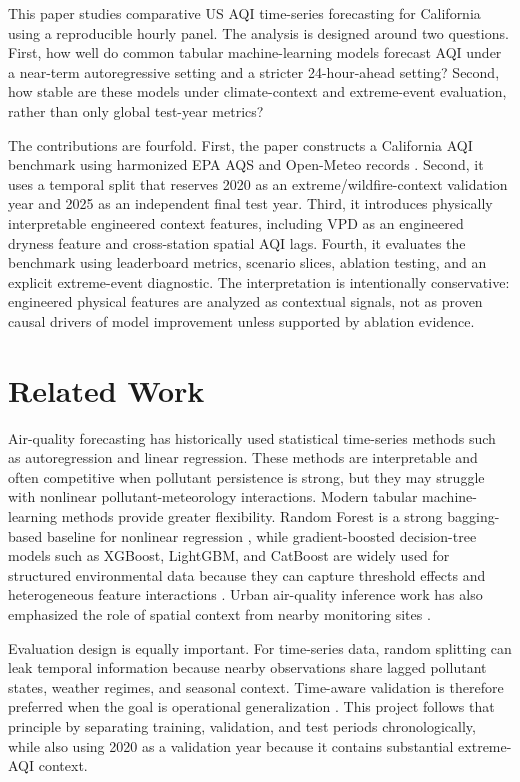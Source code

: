 \documentclass[11pt,a4paper]{article}
\begin{document}
This paper studies comparative US AQI time-series forecasting for California using a reproducible hourly panel. The analysis is designed around two questions. First, how well do common tabular machine-learning models forecast AQI under a near-term autoregressive setting and a stricter 24-hour-ahead setting? Second, how stable are these models under climate-context and extreme-event evaluation, rather than only global test-year metrics?

The contributions are fourfold. First, the paper constructs a California AQI benchmark using harmonized EPA AQS and Open-Meteo records \cite{epa_aqs,epa_aqs_api}. Second, it uses a temporal split that reserves 2020 as an extreme/wildfire-context validation year and 2025 as an independent final test year. Third, it introduces physically interpretable engineered context features, including VPD as an engineered dryness feature and cross-station spatial AQI lags. Fourth, it evaluates the benchmark using leaderboard metrics, scenario slices, ablation testing, and an explicit extreme-event diagnostic. The interpretation is intentionally conservative: engineered physical features are analyzed as contextual signals, not as proven causal drivers of model improvement unless supported by ablation evidence.

\section{Related Work}
Air-quality forecasting has historically used statistical time-series methods such as autoregression and linear regression. These methods are interpretable and often competitive when pollutant persistence is strong, but they may struggle with nonlinear pollutant-meteorology interactions. Modern tabular machine-learning methods provide greater flexibility. Random Forest is a strong bagging-based baseline for nonlinear regression \cite{breiman2001random}, while gradient-boosted decision-tree models such as XGBoost, LightGBM, and CatBoost are widely used for structured environmental data because they can capture threshold effects and heterogeneous feature interactions \cite{chen2016xgboost,ke2017lightgbm,prokhorenkova2018catboost}. Urban air-quality inference work has also emphasized the role of spatial context from nearby monitoring sites \cite{zheng2013uair}.

Evaluation design is equally important. For time-series data, random splitting can leak temporal information because nearby observations share lagged pollutant states, weather regimes, and seasonal context. Time-aware validation is therefore preferred when the goal is operational generalization \cite{bergmeir2018note,roberts2017crossvalidation}. This project follows that principle by separating training, validation, and test periods chronologically, while also using 2020 as a validation year because it contains substantial extreme-AQI context.
\end{document}
